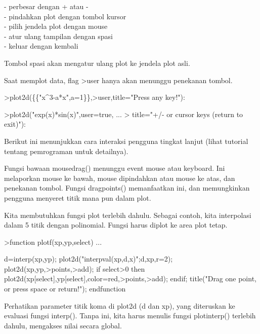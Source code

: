 \documentclass{article}
\begin{document}
\begin{eulernotebook}
\begin{eulercomment}
\begin{eulercomment}
\begin{eulercomment}
\begin{eulercomment}
\begin{eulercomment}
- perbesar dengan + atau -\\
- pindahkan plot dengan tombol kursor\\
- pilih jendela plot dengan mouse\\
- atur ulang tampilan dengan spasi\\
- keluar dengan kembali

Tombol spasi akan mengatur ulang plot ke jendela plot asli.

Saat memplot data, flag \textgreater{}user hanya akan menunggu penekanan tombol.
\end{eulercomment}
\begin{eulerprompt}
>plot2d(\{\{"x^3-a*x",a=1\}\},>user,title="Press any key!"):
\end{eulerprompt}
\begin{eulerprompt}
>plot2d("exp(x)*sin(x)",user=true, ...
>  title="+/- or cursor keys (return to exit)"):
\end{eulerprompt}
\begin{eulercomment}
Berikut ini menunjukkan cara interaksi pengguna tingkat lanjut (lihat
tutorial tentang pemrograman untuk detailnya).

Fungsi bawaan mousedrag() menunggu event mouse atau keyboard. Ini
melaporkan mouse ke bawah, mouse dipindahkan atau mouse ke atas, dan
penekanan tombol. Fungsi dragpoints() memanfaatkan ini, dan
memungkinkan pengguna menyeret titik mana pun dalam plot.

Kita membutuhkan fungsi plot terlebih dahulu. Sebagai contoh, kita
interpolasi dalam 5 titik dengan polinomial. Fungsi harus diplot ke
area plot tetap.
\end{eulercomment}
\begin{eulerprompt}
>function plotf(xp,yp,select) ...
\end{eulerprompt}
\begin{eulerudf}
    d=interp(xp,yp);
    plot2d("interpval(xp,d,x)";d,xp,r=2);
    plot2d(xp,yp,>points,>add);
    if select>0 then
      plot2d(xp[select],yp[select],color=red,>points,>add);
    endif;
    title("Drag one point, or press space or return!");
  endfunction
\end{eulerudf}
\begin{eulercomment}
Perhatikan parameter titik koma di plot2d (d dan xp), yang diteruskan
ke evaluasi fungsi interp(). Tanpa ini, kita harus menulis fungsi
plotinterp() terlebih dahulu, mengakses nilai secara global.


\end{eulercomment}
\end{eulercomment}
\end{eulercomment}
\end{eulercomment}
\end{eulercomment}
\end{eulernotebook}
\end{document}
